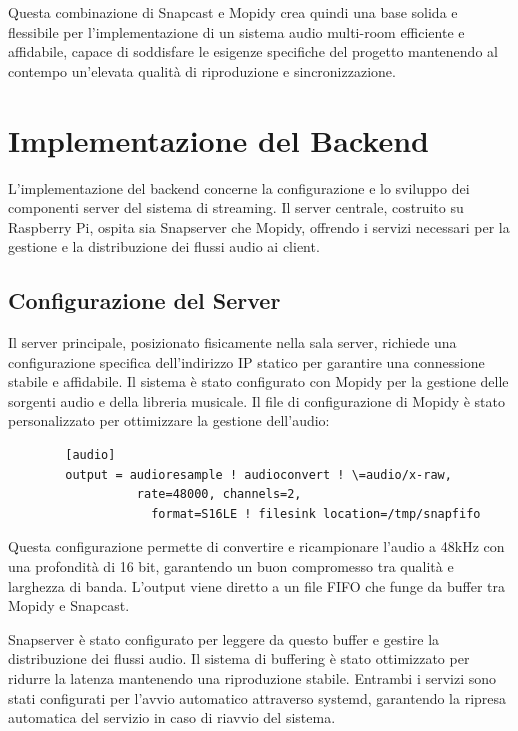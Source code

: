 Questa combinazione di Snapcast e Mopidy crea quindi una base solida e flessibile per l'implementazione di un sistema audio multi-room efficiente e affidabile, capace di soddisfare le esigenze specifiche del progetto mantenendo al contempo un'elevata qualità di riproduzione e sincronizzazione.

\section{Implementazione del Backend}
\noindent


L'implementazione del backend concerne la configurazione e lo sviluppo dei componenti server del sistema di streaming. Il server centrale, costruito su Raspberry Pi, ospita sia Snapserver che Mopidy, offrendo i servizi necessari per la gestione e la distribuzione dei flussi audio ai client.

\subsection{Configurazione del Server}

Il server principale, posizionato fisicamente nella sala server, richiede una configurazione specifica dell'indirizzo IP statico per garantire una connessione stabile e affidabile. Il sistema è stato configurato con Mopidy per la gestione delle sorgenti audio e della libreria musicale. Il file di configurazione di Mopidy è stato personalizzato per ottimizzare la gestione dell'audio:


  \begin{table}[H]
    \begin{algorithm}[H]
      \caption{}
      \BlankLine
      \begin{verbatim}
        [audio]
        output = audioresample ! audioconvert ! \=audio/x-raw,
                  rate=48000, channels=2,
                    format=S16LE ! filesink location=/tmp/snapfifo
      \end{verbatim}
    \end{algorithm}
    \caption{Esempio di configurazione della pipeline audio di Mopidy.}
    \end{table}

Questa configurazione permette di convertire e ricampionare l'audio a 48kHz con una profondità di 16 bit, garantendo un buon compromesso tra qualità e larghezza di banda. L'output viene diretto a un file FIFO che funge da buffer tra Mopidy e Snapcast.

Snapserver è stato configurato per leggere da questo buffer e gestire la distribuzione dei flussi audio. Il sistema di buffering è stato ottimizzato per ridurre la latenza mantenendo una riproduzione stabile. Entrambi i servizi sono stati configurati per l'avvio automatico attraverso systemd, garantendo la ripresa automatica del servizio in caso di riavvio del sistema.

